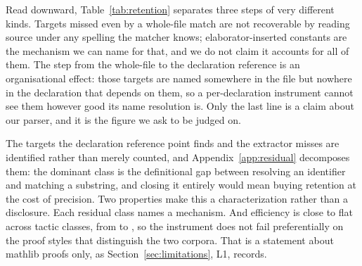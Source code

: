 Read downward, Table~\ref{tab:retention} separates three steps of very
different kinds. Targets missed even by a whole-file match are not recoverable
by reading source under any spelling the matcher knows; elaborator-inserted
constants are the mechanism we can name for that, and we do not claim it
accounts for all of them. The step from the whole-file to the declaration
reference is an organisational effect: those targets are named somewhere in the
file but nowhere in the declaration that depends on them, so a per-declaration
instrument cannot see them however good its name resolution is. Only the last
line is a claim about our parser, and it is the figure we ask to be judged on.

The \residualTargets{} targets the declaration reference point finds and the
extractor misses are identified rather than merely counted, and
Appendix~\ref{app:residual} decomposes them: the dominant class is the
definitional gap between resolving an identifier and matching a substring, and
closing it entirely would mean buying retention at the cost of precision. Two
properties make this a characterization rather than a disclosure. Each residual
class names a mechanism. And efficiency is close to flat across tactic classes,
from \efficiencyByClassMin{} to \efficiencyByClassMax{}, so the instrument does
not fail preferentially on the proof styles that distinguish the two corpora.
That is a statement about mathlib proofs only, as
Section~\ref{sec:limitations}, L1, records.
